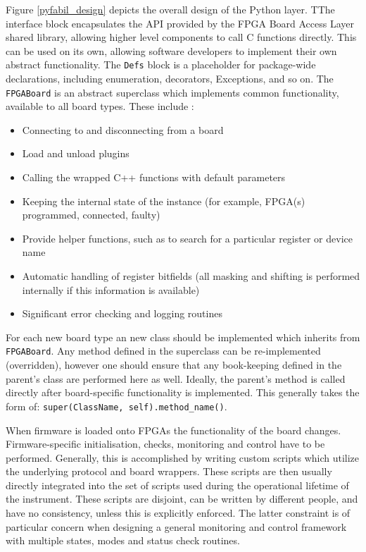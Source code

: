 \documentclass[a4paper,11pt]{article}
\begin{document}
Figure \ref{pyfabil_design} depicts the overall design of the Python layer. TThe 
interface block encapsulates the API provided by the FPGA Board Access Layer 
shared library, allowing higher level components to call C functions directly. 
This can be used on its own, allowing software developers to implement their own 
abstract functionality. The \texttt{Defs} block is a placeholder for 
package-wide declarations, including enumeration, decorators, Exceptions, and so 
on. The \texttt{FPGABoard} is an abstract superclass which implements common 
functionality, available to all board types. These include :
\begin{itemize}
 \item Connecting to and disconnecting from a board
 \item Load and unload plugins
 \item Calling the wrapped C++ functions with default parameters
 \item Keeping the internal state of the instance (for example, FPGA(s) 
programmed, connected, faulty)
 \item Provide helper functions, such as to search for a particular register or 
device name
 \item Automatic handling of register bitfields (all masking and shifting is 
performed internally if this information is available)
\item Significant error checking and logging routines
\end{itemize}

For each new board type an new class should be implemented which inherits from 
\texttt{FPGABoard}. Any method defined in the superclass can be re-implemented 
(overridden), however one should ensure that any book-keeping defined in the 
parent's class are performed here as well. Ideally, the parent's method is 
called directly after board-specific functionality is implemented. This 
generally takes the form of: \texttt{super(ClassName, self).method\_name()}. 

When firmware is loaded onto FPGAs the functionality of the board changes. 
Firmware-specific initialisation, checks, monitoring and control have to be 
performed. Generally, this is accomplished by writing custom scripts which 
utilize the underlying protocol and board wrappers. These scripts are then 
usually directly integrated into the set of scripts used during the 
operational lifetime of the instrument. These scripts are disjoint, can be 
written by different people, and have no consistency, unless this is 
explicitly enforced. The latter constraint is of particular concern when 
designing a general monitoring and control framework with multiple states, 
modes and status check routines. 
\end{document}
